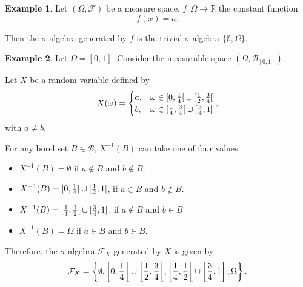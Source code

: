 \documentclass[a4paper]{scrartcl}
\newcommand{\R}{\mathbb{R}}
\theoremstyle{definition}
\newtheorem{example}{Example}[section]
\theoremstyle{plain}
\theoremstyle{remark}
\begin{document}
\begin{example}
  Let $(\Omega, \mathcal{F})$ be a measure space, $f\colon \Omega \to \R$ the constant function
  \begin{equation*}
    f(x) = a.
  \end{equation*}

  Then the $\sigma$-algebra generated by $f$ is the trivial $\sigma$-algebra $\{\emptyset, \Omega\}$.
\end{example}

\begin{example}
  \label{eg:sigmaalgebrageneratedbytwovaluedfunction}
  Let $\Omega = [0, 1]$. Consider the measurable space $(\Omega, \mathcal{B}_{[0, 1]})$.

  Let $X$ be a random variable defined by
  \begin{equation*}
    X(\omega) =
    \begin{cases}
      a, &\omega \in \interval[open right]{0}{\frac{1}{4}} \cup \interval[open right]{\frac{1}{2}}{\frac{3}{4}} \\
      b, &\omega \in \interval[open right]{\frac{1}{4}}{\frac{3}{4}} \cup \interval{\frac{3}{4}}{1}
    \end{cases},
  \end{equation*}
  with $a \neq b$.

  For any borel set $B \in \mathcal{B}$, $X^{-1}(B)$ can take one of four values.
  \begin{itemize}
    \item $X^{-1}(B) = \emptyset$ if $a \notin B$ and $b \notin B$.

    \item $X^{-1}(B) = \interval[open right]{0}{\frac{1}{4}} \cup \interval[open right]{\frac{1}{2}}{1}$, if $a \in B$ and $b \notin B$.

    \item $X^{-1}(B) = \interval[open right]{\frac{1}{4}}{\frac{1}{2}} \cup \interval{\frac{3}{4}}{1}$, if $a \notin B$ and $b \in B$

    \item $X^{-1}(B) = \Omega$ if $a \in B$ and $b \in B$.
  \end{itemize}

  Therefore, the $\sigma$-algebra $\mathcal{F}_{X}$ generated by $X$ is given by
  \begin{equation*}
    \mathcal{F}_{X} = \left\{ \emptyset, \interval[open right, scaled]{0}{\frac{1}{4}} \cup \interval[open right, scaled]{\frac{1}{2}}{\frac{3}{4}}, \interval[open right, scaled]{\frac{1}{4}}{\frac{1}{2}} \cup \left[\frac{3}{4}, 1\right], \Omega \right\}.
  \end{equation*}
\end{example}
\end{document}
